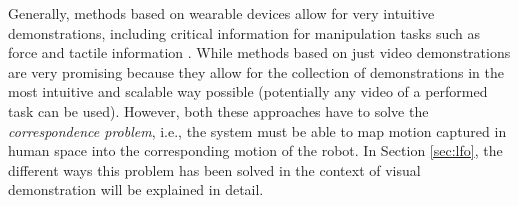 Generally, methods based on wearable devices allow for very intuitive demonstrations, including critical information for manipulation tasks such as force and tactile information \cite{liu2019_mirroring_without_overimitation}. While methods based on just video demonstrations are very promising because they allow for the collection of demonstrations in the most intuitive and scalable way possible (potentially any video of a performed task can be used). However, both these approaches have to solve the \textit{correspondence problem}, i.e., the system must be able to map motion captured in human space into the corresponding motion of the robot. In Section \ref{sec:lfo}, the different ways this problem has been solved in the context of visual demonstration will be explained in detail.

